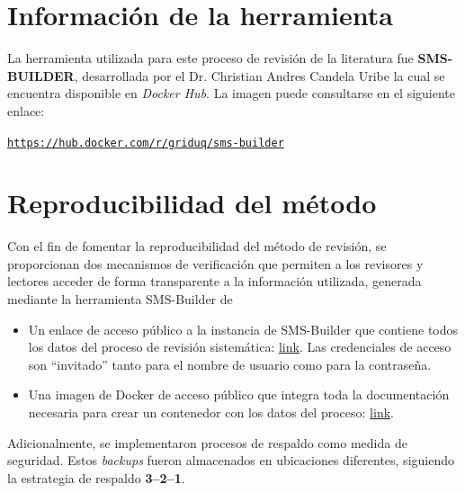\section{Información de la herramienta}

\noindent
La herramienta utilizada para este proceso de revisión de la literatura fue \textbf{SMS-BUILDER}, desarrollada por el Dr. Christian Andres Candela Uribe la cual se encuentra disponible en \textit{Docker Hub}. La imagen puede consultarse en el siguiente enlace:

\begin{center}
	\href{https://hub.docker.com/r/griduq/sms-builder}{\texttt{https://hub.docker.com/r/griduq/sms-builder}}
\end{center}



\section{Reproducibilidad del método}
\noindent
Con el fin de fomentar la reproducibilidad del método de revisión, se proporcionan dos mecanismos de verificación que permiten a los revisores y lectores acceder de forma transparente a la información utilizada, generada mediante la herramienta SMS-Builder de~\cite{SMSBuilder2020}
\begin{itemize}
	\item Un enlace de acceso público a la instancia de SMS-Builder que contiene todos los datos del proceso de revisión sistemática: \href{https://sms-htcondor.iti.grid.uniquindio.edu.co}{link}. Las credenciales de acceso son ``invitado'' tanto para el nombre de usuario como para la contraseña.
	\item Una imagen de Docker de acceso público que integra toda la documentación necesaria para crear un contenedor con los datos del proceso: \href{https://hub.docker.com/r/parritap/sms-htcondor-universes}{link}.
\end{itemize}

\noindent
Adicionalmente, se implementaron procesos de respaldo como medida de seguridad. Estos \textit{backups} fueron almacenados en ubicaciones diferentes, siguiendo la estrategia de respaldo \textbf{3--2--1}.



